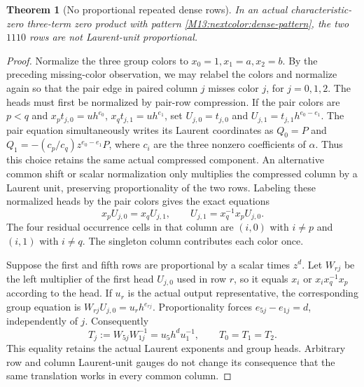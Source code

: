 \documentclass[11pt,a4paper,oneside]{report}
\newtheorem{theorem}{Theorem}[section]
\theoremstyle{definition}
\theoremstyle{remark}
\begin{document}
\begin{theorem}[No proportional repeated dense rows]
\label{M13:nextcolor:no-proportional}
In an actual characteristic-zero three-term zero product with
pattern \eqref{M13:nextcolor:dense-pattern}, the two $1110$ rows are
not Laurent-unit proportional.
\end{theorem}
\begin{proof}
Normalize the three group colors to $x_0=1,x_1=a,x_2=b$.
By the preceding missing-color observation, we may relabel the
colors and normalize again so that the pair edge in paired column
$j$ misses color $j$, for $j=0,1,2$.
The heads must first be normalized by pair-row compression.
If the pair colors are $p<q$ and
$x_pt_{j,0}=u h^{e_0}$, $x_qt_{j,1}=u h^{e_1}$, set
$U_{j,0}=t_{j,0}$ and $U_{j,1}=t_{j,1}h^{e_0-e_1}$.
The pair equation simultaneously writes its Laurent coordinates as
$Q_0=P$ and $Q_1=-(c_p/c_q)z^{e_0-e_1}P$, where $c_i$ are
the three nonzero coefficients of $\alpha$.
Thus this choice retains the same actual compressed component.
An alternative common shift or scalar normalization only multiplies
the compressed column by a Laurent unit, preserving proportionality
of the two rows. Labeling these normalized heads by the pair colors
gives the exact equations
\[
 x_pU_{j,0}=x_qU_{j,1},\qquad
 U_{j,1}=x_q^{-1}x_pU_{j,0}.
\]
The four residual occurrence cells in that column are
$(i,0)$ with $i\ne p$ and $(i,1)$ with $i\ne q$.
The singleton column contributes each color once.

Suppose the first and fifth rows are proportional by a scalar
times $z^d$. Let $W_{rj}$ be the left multiplier of the first head
$U_{j,0}$ used in row $r$, so it equals $x_i$ or
$x_i x_q^{-1}x_p$ according to the head. If $u_r$ is the actual
output representative, the corresponding group equation is
$W_{rj}U_{j,0}=u_rh^{e_{rj}}$.
Proportionality forces $e_{5j}-e_{1j}=d$, independently of $j$.
Consequently
\begin{equation}\label{M13:nextcolor:translations}
 T_j:=W_{5j}W_{1j}^{-1}=u_5h^d u_1^{-1},
 \qquad T_0=T_1=T_2.
\end{equation}
This equality retains the actual Laurent exponents and group heads.
Arbitrary row and column Laurent-unit gauges do not change its
consequence that the same translation works in every common column.


\end{proof}
\end{document}
